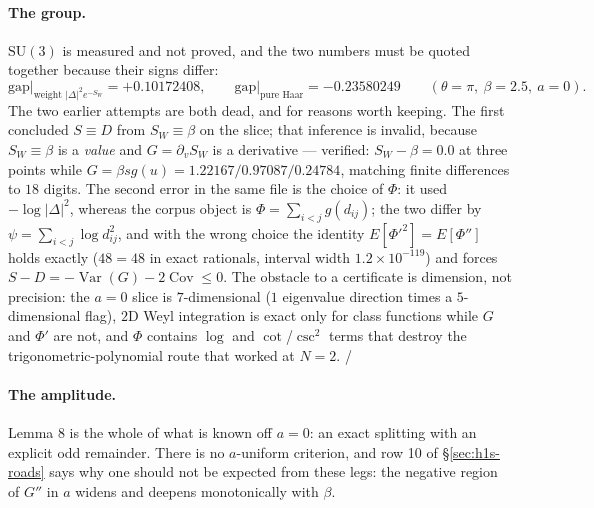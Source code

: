 \paragraph{The group.} $\mathrm{SU}(3)$ is measured and not proved, and the two numbers must be quoted
together because their signs differ:
\begin{equation}
\mathrm{gap}\big|_{\text{weight }|\Delta|^{2}e^{-S_W}}=+0.10172408,\qquad
\mathrm{gap}\big|_{\text{pure Haar}}=-0.23580249
\qquad(\theta=\pi,\ \beta=2.5,\ a=0) .
\label{eq:h1s-su3}
\end{equation}
The two earlier attempts are both dead, and for reasons worth keeping. The first concluded $S\equiv D$
from $S_{W}\equiv\beta$ on the slice; that inference is invalid, because $S_{W}\equiv\beta$ is a
\emph{value} and $G=\partial_{v}S_{W}$ is a derivative --- verified: $S_{W}-\beta=0.0$ at three points
while $G=\beta sg(u)=1.22167/0.97087/0.24784$, matching finite differences to $18$ digits. The second
error in the same file is the choice of $\Phi$: it used $-\log|\Delta|^{2}$, whereas the corpus object
is $\Phi=\sum_{i<j}g(d_{ij})$; the two differ by $\psi=\sum_{i<j}\log d_{ij}^{2}$, and with the wrong
choice the identity $E[\Phi'^{2}]=E[\Phi'']$ holds exactly ($48=48$ in exact rationals, interval width
$1.2\times10^{-119}$) and forces $S-D=-\operatorname{Var}(G)-2\operatorname{Cov}\le0$. The obstacle to
a certificate is dimension, not precision: the $a=0$ slice is $7$-dimensional ($1$ eigenvalue
direction times a $5$-dimensional flag), $2$D Weyl integration is exact only for class functions while
$G$ and $\Phi'$ are not, and $\Phi$ contains $\log$ and $\cot$/$\csc^{2}$ terms that destroy the
trigonometric-polynomial route that worked at $N=2$. \LE{}/~\LM


\paragraph{The amplitude.} Lemma 8 is the whole of what is known off $a=0$: an exact splitting with an
explicit odd remainder. There is no $a$-uniform criterion, and row 10 of \S\ref{sec:h1s-roads} says why
one should not be expected from these legs: the negative region of $G''$ in $a$ widens and deepens
monotonically with $\beta$.

